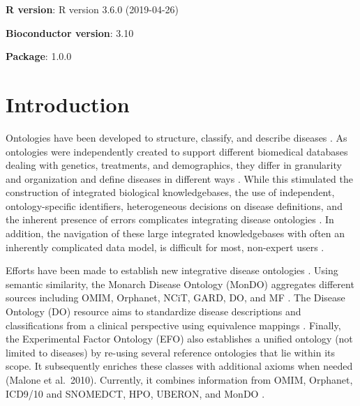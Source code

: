 \documentclass[9pt,a4paper,]{extarticle}
\begin{document}
\textbf{R version}: R version 3.6.0 (2019-04-26)

\textbf{Bioconductor version}: 3.10

\textbf{Package}: 1.0.0

\hypertarget{introduction}{%
\section{Introduction}\label{introduction}}

Ontologies have been developed to structure, classify, and describe diseases \citep{Gruber1993, Haendel2018, Hoehndorf2013}. As ontologies were independently created to support different biomedical databases dealing with genetics, treatments, and demographics, they differ in granularity and organization and define diseases in different ways \citep{Haendel2018, Hasnain2014, Hoehndorf2013, Kibbe2015, Livingston2015, Malone2010, Rappaport2013}. While this stimulated the construction of integrated biological knowledgebases, the use of independent, ontology-specific identifiers, heterogeneous decisions on disease definitions, and the inherent presence of errors complicates integrating disease ontologies \citep{Livingston2015, Rappaport2013}. In addition, the navigation of these large integrated knowledgebases with often an inherently complicated data model, is difficult for most, non-expert users \citep{Hasnain2014, Hu2017, Livingston2015}.

Efforts have been made to establish new integrative disease ontologies \citep{Mungall2017, Shefchek2019, Rappaport2013}. Using semantic similarity, the Monarch Disease Ontology (MonDO) aggregates different sources including OMIM, Orphanet, NCiT, GARD, DO, and MF \citep{Mungall2017, Shefchek2019}. The Disease Ontology (DO) resource aims to standardize disease descriptions and classifications from a clinical perspective using equivalence mappings \citep{Cheng2013, Schriml2015, Yu2015}. Finally, the Experimental Factor Ontology (EFO) also establishes a unified ontology (not limited to diseases) by re-using several reference ontologies that lie within its scope. It subsequently enriches these classes with additional axioms when needed (Malone et al.~2010). Currently, it combines information from OMIM, Orphanet, ICD9/10 and SNOMEDCT, HPO, UBERON, and MonDO \citep{EFO2019}.
\end{document}
